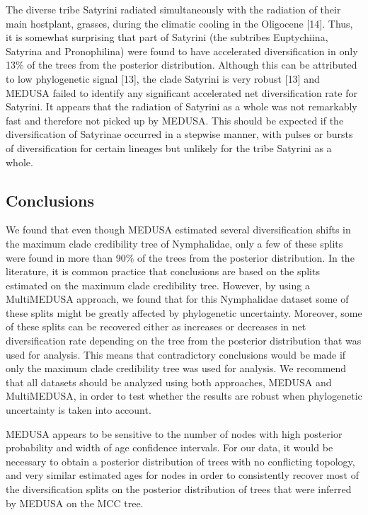 \documentclass[10pt]{article}
\begin{document}
The diverse tribe Satyrini radiated simultaneously with the radiation of
their main hostplant, grasses, during the climatic cooling in the
Oligocene {[}14{]}. Thus, it is somewhat surprising that part of
Satyrini (the subtribes Euptychiina, Satyrina and Pronophilina) were
found to have accelerated diversification in only 13\% of the trees from
the posterior distribution. Although this can be attributed to low
phylogenetic signal {[}13{]}, the clade Satyrini is very robust {[}13{]}
and MEDUSA failed to identify any significant accelerated net
diversification rate for Satyrini. It appears that the radiation of
Satyrini as a whole was not remarkably fast and therefore not picked up
by MEDUSA. This should be expected if the diversification of Satyrinae
occurred in a stepwise manner, with pulses or bursts of diversification
for certain lineages but unlikely for the tribe Satyrini as a whole.

\subsection*{Conclusions}
We found that even though MEDUSA estimated several diversification
shifts in the maximum clade credibility tree of Nymphalidae, only a few
of these splits were found in more than 90\% of the trees from the
posterior distribution. In the literature, it is common practice that
conclusions are based on the splits estimated on the maximum clade
credibility tree. However, by using a MultiMEDUSA approach, we found
that for this Nymphalidae dataset some of these splits might be greatly
affected by phylogenetic uncertainty. Moreover, some of these splits can
be recovered either as increases or decreases in net diversification
rate depending on the tree from the posterior distribution that was used
for analysis. This means that contradictory conclusions would be made if
only the maximum clade credibility tree was used for analysis. We
recommend that all datasets should be analyzed using both approaches,
MEDUSA and MultiMEDUSA, in order to test whether the results are robust
when phylogenetic uncertainty is taken into account.

MEDUSA appears to be sensitive to the number of nodes with high
posterior probability and width of age confidence intervals. For our
data, it would be necessary to obtain a posterior distribution of trees
with no conflicting topology, and very similar estimated ages for nodes
in order to consistently recover most of the diversification splits on
the posterior distribution of trees that were inferred by MEDUSA on the
MCC tree.
\end{document}
